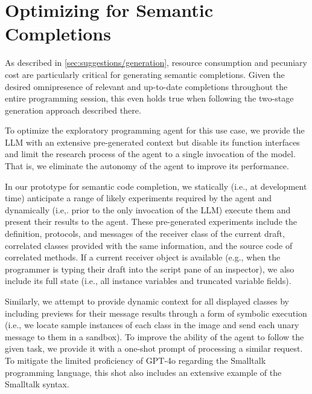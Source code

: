 
\section{Optimizing for Semantic Completions}
\label{sec:suggestions/completions}

As described in \cref{sec:suggestions/generation}, resource consumption and pecuniary cost are particularly critical for generating semantic completions.
Given the desired omnipresence of relevant and up-to-date completions throughout the entire programming session, this even holds true when following the two-stage generation approach described there.

To optimize the exploratory programming agent for this use case, we provide the LLM with an extensive pre-generated context but disable its function interfaces and limit the research process of the agent to a single invocation of the model.
That is, we eliminate the autonomy of the agent to improve its performance. %

In our prototype for semantic code completion, we statically (i.e., at development time) anticipate a range of likely experiments required by the agent and dynamically (i.e,. prior to the only invocation of the LLM) execute them and present their results to the agent.
These pre-generated experiments include the definition, protocols, and messages of the receiver class of the current draft, correlated classes provided with the same information, and the source code of correlated methods.
If a current receiver object is available (e.g., when the programmer is typing their draft into the script pane of an inspector), we also include its full state (i.e., all instance variables and truncated variable fields).

Similarly, we attempt to provide dynamic context for all displayed classes by including previews for their message results through a form of symbolic execution (i.e., we locate sample instances of each class in the image and send each unary message to them in a sandbox). %
To improve the ability of the agent to follow the given task, we provide it with a one-shot prompt of processing a similar request.
To mitigate the limited proficiency of GPT-4o regarding the Smalltalk programming language, this shot also includes an extensive example of the Smalltalk syntax.

